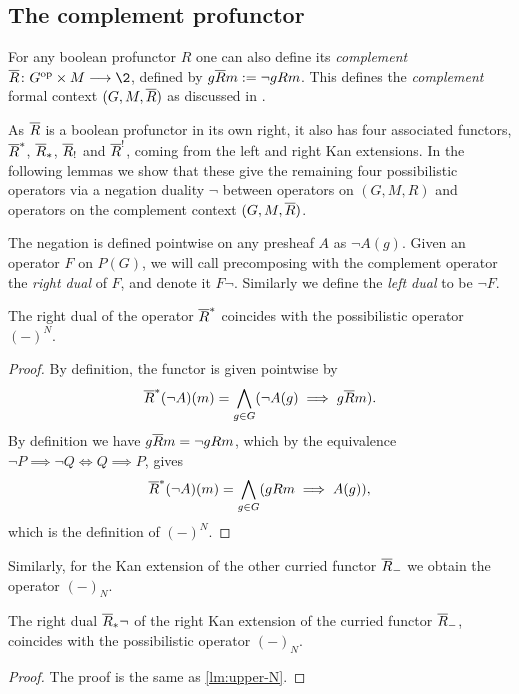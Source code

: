 \subsection{The complement profunctor}

For any boolean profunctor $R$ one can also define its \emph{complement} $\oR\: G\op\times M \to \2$, defined by $g\overline{R} m := \neg gRm$. This defines the \emph{complement} formal context $(G,M,\overline{R})$ as discussed in \cite{djouadi_prade_2011,yakub-djouadi-dubois-prade_2016}. 

As $\overline{R}$ is a boolean profunctor in its own right, it also has four associated functors, $\overline{R}^*$, $\overline{R}_*$, $\overline{R}_!$ and $\overline{R}^!$, coming from the left and right Kan extensions. In the following lemmas we show that these give the remaining four possibilistic operators via a negation duality $\neg$ between operators on $(G,M,R)$ and operators on the complement context $(G,M,\overline{R})$. 

The negation is defined pointwise on any presheaf $A$ as $\neg A(g)$. Given an operator $F$ on $P(G)$, we will call precomposing with the complement operator the \emph{right dual} of $F$, and denote it $F\neg$. Similarly we define the \emph{left dual} to be $\neg F$. 

\begin{lemma}
    \label{lm:upper-N}
    The right dual of the operator $\overline{R}^*$ coincides with the possibilistic operator $(-)^N$. 
\end{lemma}
\begin{proof}
    By definition, the functor is given pointwise by 
    \[\overline{R}^*(\neg A)(m) = \bigwedge_{g\in G}(\neg A(g)\implies g\overline{R} m).\] 
    By definition we have $g\overline{R} m = \neg gRm$, which by the equivalence $\neg P\implies \neg Q \iff Q\implies P$, gives 
    \[\overline{R}^*(\neg A)(m) = \bigwedge_{g\in G}(gRm \implies A(g)),\]
    which is the definition of $(-)^N$. 
    \end{proof}

Similarly, for the Kan extension of the other curried functor $\overline{R}_-$ we obtain the operator $(-)_N$.

\begin{lemma}
    \label{lm:lower-N}
    The right dual $\overline{R}_*\neg$ of the right Kan extension of the curried functor $\overline{R}_-$, coincides with the possibilistic operator $(-)_N$.
\end{lemma}
\begin{proof}
    The proof is the same as \cref{lm:upper-N}. 
\end{proof}


